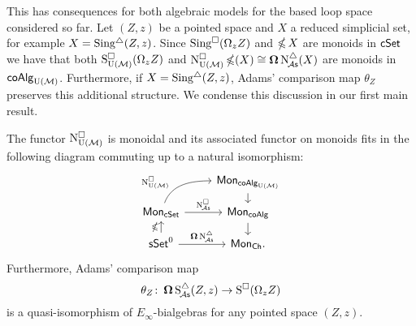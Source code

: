 This has consequences for both algebraic models for the based loop space considered so far.
Let $(Z,z)$ be a pointed space and $X$ a reduced simplicial set, for example $X = \operatorname{Sing^{\triangle}}(Z,z)$.
Since $\operatorname{Sing^{\square}}(\Omega_z Z)$ and $\operatorname{\mathbb{\Omega}} X$ are monoids in $\mathsf{cSet}$ we have that both $\operatorname{S^{\square}_{{\operatorname{U}(\mathcal{M})}}}(\Omega_z Z)$ and $\operatorname{N^{\square}_{{\operatorname{U}(\mathcal{M})}}} \operatorname{\mathbb{\Omega}}(X) \cong \operatorname{\mathbf{\Omega}} \operatorname{N^{\triangle}_{\!{\mathcal{A}\mathsf{s}}}}(X)$ are monoids in $\mathsf{coAlg}_{\operatorname{U}(\mathcal{M})}$.
Furthermore, if $X = \operatorname{Sing^{\triangle}}(Z,z)$, Adams' comparison map $\theta_Z$ preserves this additional structure.
We condense this discussion in our first main result.

\begin{theorem} \label{t:1st main thm in the intro}
	The functor $\operatorname{N^{\square}_{{\operatorname{U}(\mathcal{M})}}}$ is monoidal and its associated functor on monoids fits in the following diagram commuting up to a natural isomorphism:
	\[
	\begin{tikzcd} [row sep=small]
		& \Mon_{\coAlg_\UM} \arrow[d] \\
		\Mon_{\cSet} \arrow[ru, "\cchainsUM", out=70, in=180, near start] \arrow[r, "\cchainsA"]
		& \Mon_{\coAlg} \arrow[d] \\
		\sSet^0 \arrow[r, "\cobar \schainsA"] \arrow[u, "\ccobar"]
		& \Mon_{\Ch}.
	\end{tikzcd}
	\]
	Furthermore, Adams' comparison map
	\[
	\theta_Z \colon \operatorname{\mathbf{\Omega}} \operatorname{S^{\triangle}_{\!{\mathcal{A}\mathsf{s}}}}(Z,z) \to \operatorname{S^{\square}}(\Omega_z Z)
	\]
	is a quasi-isomorphism of $E_{\infty}$-bialgebras for any pointed space $(Z,z)$.
\end{theorem}

